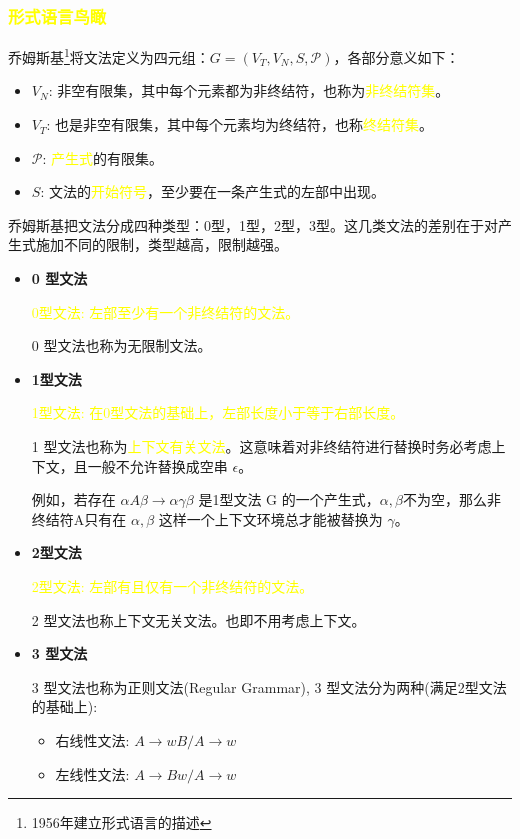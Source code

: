 \subsubsection{\textcolor{mark}{形式语言鸟瞰}}

乔姆斯基\footnote{1956年建立形式语言的描述}将文法定义为四元组：$G=(V_T,V_N,S,\mathcal{P})$，各部分意义如下：
\begin{itemize}
    \item $V_N$: 非空有限集，其中每个元素都为非终结符，也称为\textcolor{mark}{非终结符集}。
    \item $V_T$: 也是非空有限集，其中每个元素均为终结符，也称\textcolor{mark}{终结符集}。
    \item $\mathcal{P}$: \textcolor{mark}{产生式}的有限集。
    \item $S$: 文法的\textcolor{mark}{开始符号}，至少要在一条产生式的左部中出现。
\end{itemize}

乔姆斯基把文法分成四种类型：0型，1型，2型，3型。这几类文法的差别在于对产生式施加不同的限制，类型越高，限制越强。


\begin{itemize}
    \item \textbf{0 型文法}

          \textcolor{mark}{0型文法: 左部至少有一个非终结符的文法。}

          0 型文法也称为无限制文法。



    \item \textbf{1型文法}

          \textcolor{mark}{1型文法: 在0型文法的基础上，左部长度小于等于右部长度。}

          1 型文法也称为\textcolor{mark}{上下文有关文法}。这意味着对非终结符进行替换时务必考虑上下文，且一般不允许替换成空串 $\epsilon$。

          例如，若存在 $\alpha A \beta \rightarrow \alpha \gamma \beta$ 是1型文法 G 的一个产生式，$\alpha,\beta$不为空，那么非终结符A只有在 $\alpha,\beta$ 这样一个上下文环境总才能被替换为 $\gamma$。

    \item \textbf{2型文法}

          \textcolor{mark}{2型文法: 左部有且仅有一个非终结符的文法。}

          2 型文法也称\textcolor{imp}{上下文无关文法}。也即不用考虑上下文。

    \item \textbf{3 型文法}

          3 型文法也称为正则文法(Regular Grammar), 3 型文法分为两种(满足2型文法的基础上):
          \begin{itemize}
              \item 右线性文法: $A \rightarrow wB / A \rightarrow w$
              \item 左线性文法: $A \rightarrow Bw / A \rightarrow w$
          \end{itemize}
\end{itemize}

\newpage